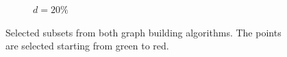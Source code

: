 \begin{figure}[H]
\begin{subfigure}[b]{0.24\linewidth}
  	\caption{\small $d=20\%$} 
  	\label{fig:20_sweden} 
  	\vspace{4ex}
  \end{subfigure}
  \caption{Selected subsets from both graph building algorithms. The points are selected starting from green to red.}
  \label{fig:sweden_dist} 
\end{figure}

